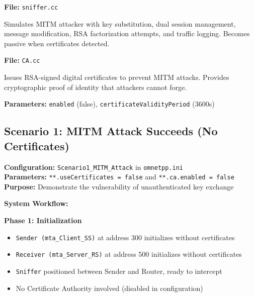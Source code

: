 \documentclass[a4paper,12pt]{extarticle}
\newcommand{\code}[1]{\texttt{\colorbox{codebackground}{#1}}}
\begin{document}
\begin{warningbox}
\textbf{File:} \code{sniffer.cc}

Simulates MITM attacker with key substitution, dual session management, message modification, RSA factorization attempts, and traffic logging. Becomes passive when certificates detected.
\end{warningbox}

\vspace{0.3cm}

\begin{successbox}
\textbf{File:} \code{CA.cc}

Issues RSA-signed digital certificates to prevent MITM attacks. Provides cryptographic proof of identity that attackers cannot forge.

\textbf{Parameters:} \code{enabled} (false), \code{certificateValidityPeriod} (3600s)
\end{successbox}

\vspace{0.5cm}

\subsection{Scenario 1: MITM Attack Succeeds (No Certificates)}

\begin{warningbox}
\textbf{Configuration:} \texttt{Scenario1\_MITM\_Attack} in \texttt{omnetpp.ini}\\
\textbf{Parameters:} \texttt{**.useCertificates = false} and \texttt{**.ca.enabled = false}\\
\textbf{Purpose:} Demonstrate the vulnerability of unauthenticated key exchange
\end{warningbox}

\vspace{0.3cm}

\textbf{System Workflow:}

\vspace{0.3cm}
\textbf{Phase 1: Initialization}
\begin{itemize}[leftmargin=1cm]
    \item \texttt{Sender (mta\_Client\_SS)} at address 300 initializes without certificates
    \item \texttt{Receiver (mta\_Server\_RS)} at address 500 initializes without certificates
    \item \texttt{Sniffer} positioned between Sender and Router, ready to intercept
    \item No Certificate Authority involved (disabled in configuration)
\end{itemize}
\end{document}
